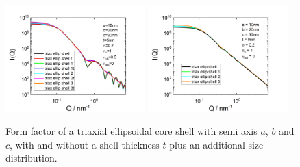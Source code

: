 \begin{figure}[htb]
\begin{center}
\includegraphics[width=0.48\textwidth]{../images/form_factor/Ellipsoid/triax_ellipsoidal_core_shell_1.png}
\includegraphics[width=0.48\textwidth]{../images/form_factor/Ellipsoid/triax_ellipsoidal_core_shell_2.png}
\end{center}
\caption{Form factor of a triaxial ellipsoidal core shell with semi
axis $a$, $b$ and $c$, with and without a shell thickness $t$ plus an additional size distribution.}
\label{fig:I_triax_ellipsoidal_core_shell}
\end{figure} 